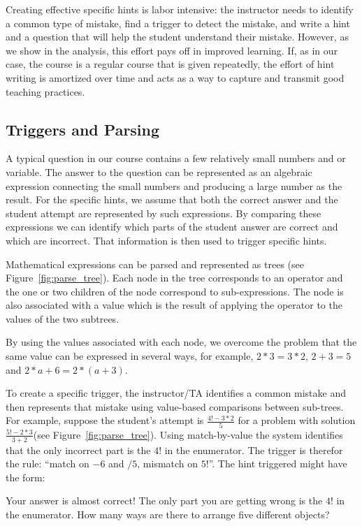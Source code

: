 \documentclass{llncs2e/llncs}
\begin{document}
Creating effective specific hints is labor intensive: the instructor needs to identify a common type of mistake, find a trigger to detect the mistake, and write a hint and a question that will help the student understand their mistake. However, as we show in the analysis, this effort pays off in improved learning. If, as in our case, the course is a regular course that is given repeatedly, the effort of hint writing is amortized over time and acts as a way to capture and transmit good teaching practices.


\subsection*{Triggers and Parsing}

A typical question in our course contains a few relatively small
numbers and or variable. The answer to the question can be represented
as an algebraic expression connecting the small numbers and producing
a large number as the result. For the specific hints, we assume that
both the correct answer and the student attempt are represented by
such expressions. By comparing these expressions we can identify which
parts of the student answer are correct and which are incorrect. That
information is then used to trigger specific hints.

Mathematical expressions can be parsed and represented as trees (see Figure~\ref{fig:parse_tree}). Each node in the tree corresponds to an operator and the one or two children of the node correspond to sub-expressions. The node is also associated with a value which is the result of applying the operator to the values of the two subtrees.

By using the values associated with each node, we overcome the problem
that the same value can be expressed in several ways, for example,
$2*3 = 3*2$, $2+3=5$ and $2*a+6 = 2*(a+3)$. 

To create a specific trigger, the instructor/TA identifies a common mistake and then represents that mistake using value-based comparisons between sub-trees. For example, suppose the student's attempt is $\frac{4!-3*2}{5}$ for a problem with solution $\frac{5!-2*3}{3+2}$(see Figure~\ref{fig:parse_tree}). Using match-by-value the system identifies that the only incorrect part is the $4!$ in the enumerator. The trigger is therefor the rule: ``match on $-6$ and $/5$, mismatch on $5!$''. The hint triggered might have the form:
\begin{displayquote}
Your answer is almost correct! The only part you are getting wrong is
the $4!$ in the enumerator. How many ways are there to arrange five different objects?
\end{displayquote}
\end{document}
